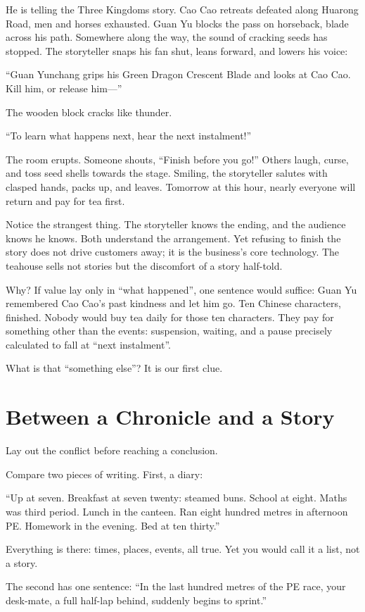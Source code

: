 He is telling the Three Kingdoms story. Cao Cao retreats defeated along Huarong Road, men and horses exhausted. Guan Yu blocks the pass on horseback, blade across his path. Somewhere along the way, the sound of cracking seeds has stopped. The storyteller snaps his fan shut, leans forward, and lowers his voice:

``Guan Yunchang grips his Green Dragon Crescent Blade and looks at Cao Cao. Kill him, or release him---''

The wooden block cracks like thunder.

``To learn what happens next, hear the next instalment!''

The room erupts. Someone shouts, ``Finish before you go!'' Others laugh, curse, and toss seed shells towards the stage. Smiling, the storyteller salutes with clasped hands, packs up, and leaves. Tomorrow at this hour, nearly everyone will return and pay for tea first.

Notice the strangest thing. The storyteller knows the ending, and the audience knows he knows. Both understand the arrangement. Yet refusing to finish the story does not drive customers away; it is the business's core technology. The teahouse sells not stories but the discomfort of a story half-told.

Why? If value lay only in ``what happened'', one sentence would suffice: Guan Yu remembered Cao Cao's past kindness and let him go. Ten Chinese characters, finished. Nobody would buy tea daily for those ten characters. They pay for something other than the events: suspension, waiting, and a pause precisely calculated to fall at ``next instalment''.

What is that ``something else''? It is our first clue.

\section{Between a Chronicle and a Story}
Lay out the conflict before reaching a conclusion.

Compare two pieces of writing. First, a diary:

``Up at seven. Breakfast at seven twenty: steamed buns. School at eight. Maths was third period. Lunch in the canteen. Ran eight hundred metres in afternoon PE. Homework in the evening. Bed at ten thirty.''

Everything is there: times, places, events, all true. Yet you would call it a list, not a story.

The second has one sentence: ``In the last hundred metres of the PE race, your desk-mate, a full half-lap behind, suddenly begins to sprint.''

